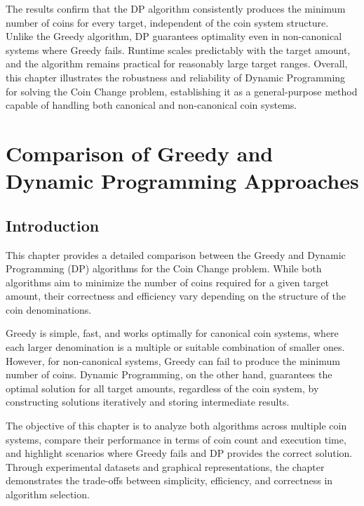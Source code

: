 \documentclass[12pt,a4paper]{report}
\begin{document}
The results confirm that the DP algorithm consistently produces the minimum number of coins for every target, independent of the coin system structure. Unlike the Greedy algorithm, DP guarantees optimality even in non-canonical systems where Greedy fails. Runtime scales predictably with the target amount, and the algorithm remains practical for reasonably large target ranges. Overall, this chapter illustrates the robustness and reliability of Dynamic Programming for solving the Coin Change problem, establishing it as a general-purpose method capable of handling both canonical and non-canonical coin systems.




\chapter{Comparison of Greedy and Dynamic Programming Approaches \centering}
\section{Introduction}
\label{sec:comparison_intro}

This chapter provides a detailed comparison between the Greedy and Dynamic Programming (DP) algorithms for the Coin Change problem. While both algorithms aim to minimize the number of coins required for a given target amount, their correctness and efficiency vary depending on the structure of the coin denominations. 

Greedy is simple, fast, and works optimally for canonical coin systems, where each larger denomination is a multiple or suitable combination of smaller ones. However, for non-canonical systems, Greedy can fail to produce the minimum number of coins. Dynamic Programming, on the other hand, guarantees the optimal solution for all target amounts, regardless of the coin system, by constructing solutions iteratively and storing intermediate results.

The objective of this chapter is to analyze both algorithms across multiple coin systems, compare their performance in terms of coin count and execution time, and highlight scenarios where Greedy fails and DP provides the correct solution. Through experimental datasets and graphical representations, the chapter demonstrates the trade-offs between simplicity, efficiency, and correctness in algorithm selection.
\end{document}
